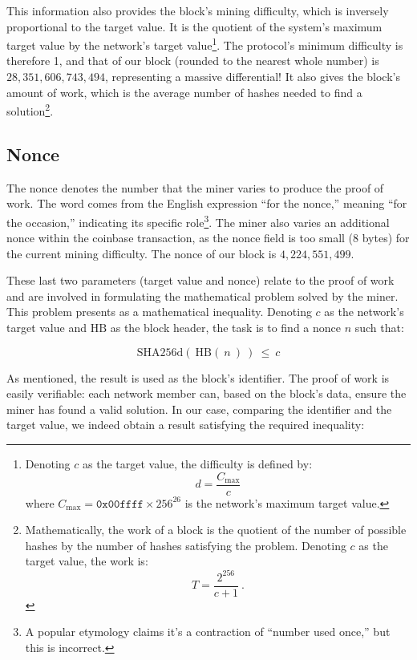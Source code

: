 \documentclass[
  a5paper,
  smalldemyvopaper,10pt,twoside,onecolumn,openright,extrafontsizes,hidelinks]{memoir}
\begin{document}
This information also provides the block's mining difficulty, which is
inversely proportional to the target value. It is the quotient of the
system's maximum target value by the network's target value\footnote{Denoting
  \(c\) as the target value, the difficulty is defined by:
  \[d = \frac{C_{\mathrm{max}}}{c}\] where
  \(C_{\mathrm{max}} = \mathtt{0x00ffff} \times 256^{26}\) is the
  network's maximum target value.}. The protocol's minimum difficulty is
therefore 1, and that of our block (rounded to the nearest whole number)
is \(28,351,606,743,494\), representing a massive differential! It also
gives the block's amount of work, which is the average number of hashes
needed to find a solution\footnote{Mathematically, the work of a block
  is the quotient of the number of possible hashes by the number of
  hashes satisfying the problem. Denoting \(c\) as the target value, the
  work is: \[T = \frac{2^{256}}{c + 1} ~.\]}.

\subsection{Nonce}\label{nonce}

The nonce denotes the number that the miner varies to produce the proof
of work. The word comes from the English expression ``for the nonce,''
meaning ``for the occasion,'' indicating its specific role\footnote{A
  popular etymology claims it's a contraction of ``number used once,''
  but this is incorrect.}. The miner also varies an additional nonce
within the coinbase transaction, as the nonce field is too small (8
bytes) for the current mining difficulty. The nonce of our block is
\(4,224,551,499\).

These last two parameters (target value and nonce) relate to the proof
of work and are involved in formulating the mathematical problem solved
by the miner. This problem presents as a mathematical inequality.
Denoting \(c\) as the network's target value and \(\mathrm{HB}\) as the
block header, the task is to find a nonce \(n\) such that:

\[\mathrm{SHA256d} ( \ \mathrm{HB} ( \ n \ ) \ ) ~ \le ~ c\]

As mentioned, the result is used as the block's identifier. The proof of
work is easily verifiable: each network member can, based on the block's
data, ensure the miner has found a valid solution. In our case,
comparing the identifier and the target value, we indeed obtain a result
satisfying the required inequality:
\end{document}

